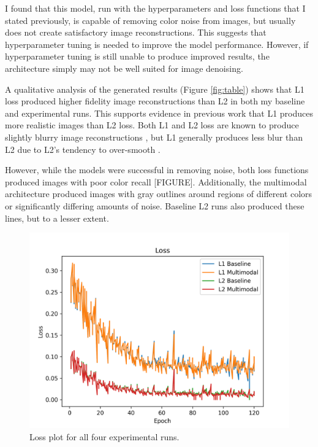 \documentclass[10pt,twocolumn]{article}
\begin{document}
I found that this model, run with the hyperparameters and loss functions that I stated previously, is capable of removing color noise from images, but usually does not create satisfactory image reconstructions. This suggests that hyperparameter tuning is needed to improve the model performance. However, if hyperparameter tuning is still unable to produce improved results, the architecture simply may not be well suited for image denoising.

A qualitative analysis of the generated results (Figure \ref{fig:table}) shows that L1 loss produced higher fidelity image reconstructions than L2 in both my baseline and experimental runs. This supports evidence in previous work that L1 produces more realistic images than L2 loss. Both L1 and L2 loss are known to produce slightly blurry image reconstructions \cite{lossblur}, but L1 generally produces less blur than L2 due to L2’s tendency to over-smooth \cite{lossdocs}.

However, while the models were successful in removing noise, both loss functions produced images with poor color recall [FIGURE]. Additionally, the multimodal architecture produced images with gray outlines around regions of different colors or significantly differing amounts of noise. Baseline L2 runs also produced these lines, but to a lesser extent.

\begin{figure}[h]
	\centering
        \includegraphics[scale=0.5]{images/lossplot.png}
	\caption{Loss plot for all four experimental runs.}
	\label{fig:lossplot}
\end{figure}
\end{document}
